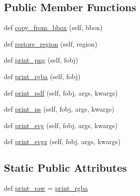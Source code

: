 \subsection*{Public Member Functions}
\begin{DoxyCompactItemize}
\item 
def \hyperlink{classmatplotlib_1_1backends_1_1backend__cairo_1_1FigureCanvasCairo_afe8d0391ef42c4158c70eef253e0c6a2}{copy\+\_\+from\+\_\+bbox} (self, bbox)
\item 
def \hyperlink{classmatplotlib_1_1backends_1_1backend__cairo_1_1FigureCanvasCairo_a903a019f70b282d461d1a74dce358e39}{restore\+\_\+region} (self, region)
\item 
def \hyperlink{classmatplotlib_1_1backends_1_1backend__cairo_1_1FigureCanvasCairo_a96bdb10acd9b65d793a1c90622993a16}{print\+\_\+png} (self, fobj)
\item 
def \hyperlink{classmatplotlib_1_1backends_1_1backend__cairo_1_1FigureCanvasCairo_a2ab02131b22309efa87d2faac07aa60b}{print\+\_\+rgba} (self, fobj)
\item 
def \hyperlink{classmatplotlib_1_1backends_1_1backend__cairo_1_1FigureCanvasCairo_a993d636a9416ec2e77a6aebb17871a62}{print\+\_\+pdf} (self, fobj, args, kwargs)
\item 
def \hyperlink{classmatplotlib_1_1backends_1_1backend__cairo_1_1FigureCanvasCairo_a48c7c4d9fa5b0a4d9fa5aad43ba4ca1f}{print\+\_\+ps} (self, fobj, args, kwargs)
\item 
def \hyperlink{classmatplotlib_1_1backends_1_1backend__cairo_1_1FigureCanvasCairo_a7e7553aea1688a17f179a5bdf344bbd8}{print\+\_\+svg} (self, fobj, args, kwargs)
\item 
def \hyperlink{classmatplotlib_1_1backends_1_1backend__cairo_1_1FigureCanvasCairo_a0bb3251c7b8ec4ebdd19c1f3f35f01b3}{print\+\_\+svgz} (self, fobj, args, kwargs)
\end{DoxyCompactItemize}
\subsection*{Static Public Attributes}
\begin{DoxyCompactItemize}
\item 
def \hyperlink{classmatplotlib_1_1backends_1_1backend__cairo_1_1FigureCanvasCairo_af3ce9749e007c7121efad6c4e1f1560e}{print\+\_\+raw} = \hyperlink{classmatplotlib_1_1backends_1_1backend__cairo_1_1FigureCanvasCairo_a2ab02131b22309efa87d2faac07aa60b}{print\+\_\+rgba}
\end{DoxyCompactItemize}


